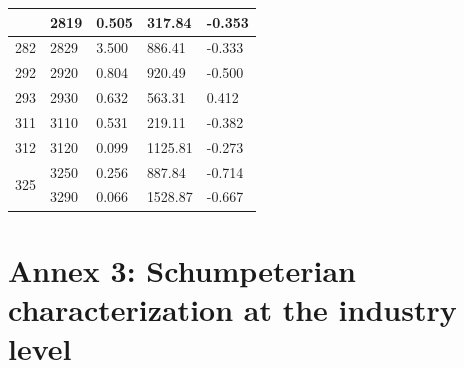 \documentclass[12pt,a4paper]{article}
\begin{document}
{\begin{longtable}{@{}cllll@{}}
	& 2819                                         & 0.505                           & 317.84                           & -0.353                           \\ \hline
	282                                             & 2829                                         & 3.500                           & 886.41                           & -0.333                           \\ \hline
	292                                             & 2920                                         & 0.804                           & 920.49                           & -0.500                           \\ \hline
	293                                             & 2930                                         & 0.632                           & 563.31                           & 0.412                            \\ \hline
	311                                             & 3110                                         & 0.531                           & 219.11                           & -0.382                           \\ \hline
	312                                             & 3120                                         & 0.099                           & 1125.81                          & -0.273                           \\ \hline
	\multirow{2}{*}{325}                            & 3250                                         & 0.256                           & 887.84                           & -0.714                           \\ \cline{2-5} 
	& 3290                                         & 0.066                           & 1528.87                          & -0.667                           \\ \hline
	
\end{longtable}

\newpage

\section{Annex 3: Schumpeterian characterization at the industry level}

}
\end{document}
